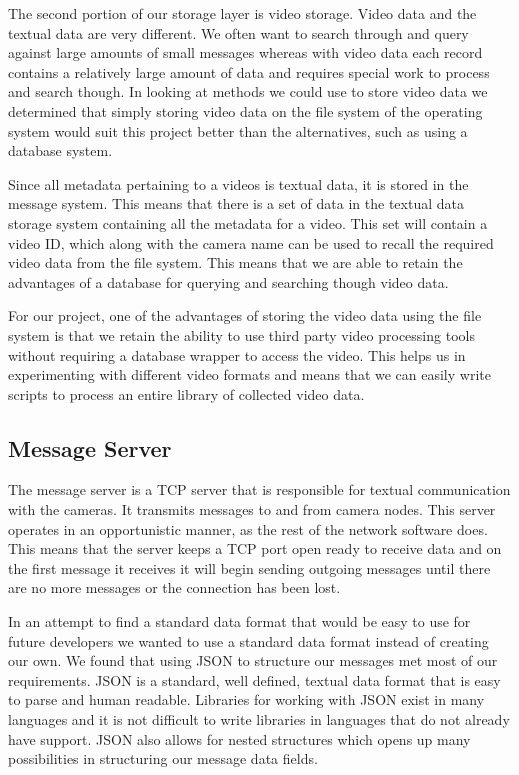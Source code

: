 The second portion of our storage layer is video storage. Video data and the
textual data are very different. We often want to search through and query
against large amounts of small messages whereas with video data each record
contains a relatively large amount of data and requires special work to process
and search though. In looking at methods we could use to store video data we
determined that simply storing video data on the file system of the operating
system would suit this project better than the alternatives, such as using a
database system.

Since all metadata pertaining to a videos is textual data, it is stored in the
message system. This means that there is a set of data in the textual data
storage system containing all the metadata for a video. This set will contain a
video ID, which along with the camera name can be used to recall the required
video data from the file system. This means that we are able to retain the
advantages of a database for querying and searching though video data.

For our project, one of the advantages of storing the video data using
the file system is that we retain the ability to use third party video
processing tools without requiring a database wrapper to access the video. This
helps us in experimenting with different video formats and means that we can 
easily write scripts to process an entire library of collected video data.


\subsection{Message Server}

The message server is a TCP server that is responsible for textual communication
with the cameras. It transmits messages to and from camera nodes. This server
operates in an opportunistic manner, as the rest of the network software does.
This means that the server keeps a TCP port open ready to receive data and on
the first message it receives it will begin sending outgoing messages until
there are no more messages or the connection has been lost.

In an attempt to find a standard data format that would be easy to use for
future developers we wanted to use a standard data format instead of creating
our own. We found that using JSON to structure our messages met most of our
requirements. JSON is a standard, well defined, textual data format that is easy
to parse and human readable. Libraries for working with JSON exist in many
languages and it is not difficult to write libraries in languages that do not
already have support. JSON also allows for nested structures which opens up many
possibilities in structuring our message data fields.

